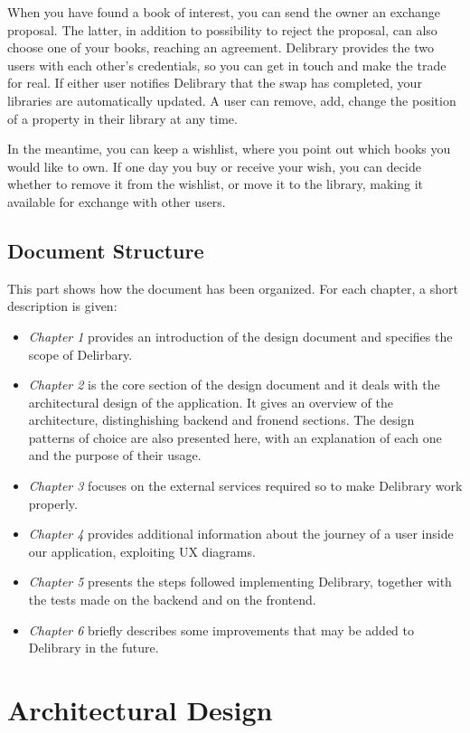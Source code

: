 When you have found a book of interest, you can send the owner an exchange proposal. The latter, in addition to possibility to reject the proposal, can also choose one of your books, reaching an agreement.
Delibrary provides the two users with each other's credentials, so you can get in touch and make the trade for real. If either user notifies Delibrary that the swap has completed, your libraries are automatically updated.
A user can remove, add, change the position of a property in their library at any time.

In the meantime, you can keep a wishlist, where you point out  which books you would like to own.
If one day you buy or receive your wish, you can decide whether to remove it from the wishlist, or move it to the library, making it available for exchange with other users.

\section{Document Structure}
This part shows how the document has been organized.
For each chapter, a short description is given:
\begin{itemize}
      \item \textit{Chapter 1} provides an introduction of the design document and specifies the scope of Delirbary.
      \item \textit{Chapter 2} is the core section of the design document and it deals with the architectural design of the application.
            It gives an overview of the architecture, distinghishing backend and fronend sections.
            The design patterns of choice are also presented here, with an explanation of each one and the purpose of their usage.
      \item \textit{Chapter 3} focuses on the external services required so to make Delibrary work properly.
      \item \textit{Chapter 4} provides additional information about the journey of a user inside our application, exploiting UX diagrams.
      \item \textit{Chapter 5} presents the steps followed implementing Delibrary, together with the tests made on the backend and on the frontend.
      \item \textit{Chapter 6} briefly describes some improvements that may be added to Delibrary in the future.
\end{itemize}

\chapter{Architectural Design}

